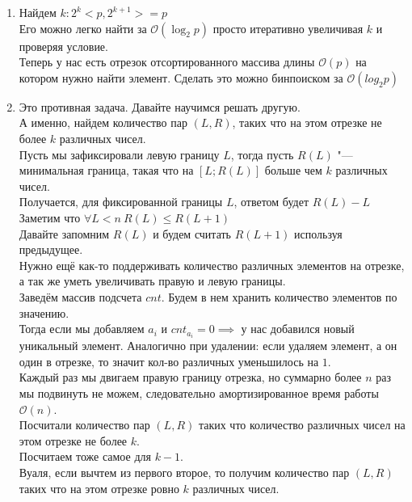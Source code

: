 \documentclass[a4paper, 10pt]{article}
\begin{document}
\begin{enumerate}

    \item{
        Найдем $k: 2^k < p, 2^{k + 1} >= p$\\
        Его можно легко найти за $\mathcal{O}(\log_2{p})$ просто итеративно увеличивая $k$ и проверяя условие.\\ 
        Теперь у нас есть отрезок отсортированного массива длины $\mathcal{O}(p)$ на котором нужно найти элемент. Сделать это можно бинпоиском за $\mathcal{O}(log_2{p})$\\
    }

    \item{
        Это противная задача. Давайте научимся решать другую.\\
        А именно, найдем количество пар $(L,R)$, таких что на этом отрезке не более $k$ различных чисел.\\
        Пусть мы зафиксировали левую границу $L$, тогда пусть $R(L)$ "--- минимальная граница, такая что на $[L; R(L)]$ больше чем $k$ различных чисел.\\
        Получается, для фиксированной границы $L$, ответом будет $R(L) - L$\\
        Заметим что $\forall L < n \medspace R(L) \leq R(L + 1)$\\
        Давайте запомним $R(L)$ и будем считать $R(L + 1)$ используя предыдущее.\\
        Нужно ещё как-то поддерживать количество различных элементов на отрезке, а так же уметь увеличивать правую и левую границы.\\
        Заведём массив подсчета $cnt$. Будем в нем хранить количество элементов по значению.\\
        Тогда если мы добавляем $a_i$ и $cnt_{a_i} = 0 \implies $ у нас добавился новый уникальный элемент.
        Аналогично при удалении: если удаляем элемент, а он один в отрезке, то значит кол-во различных уменьшилось на $1$.\\
        Каждый раз мы двигаем правую границу отрезка, но суммарно более $n$ раз мы подвинуть не можем, следовательно амортизированное время работы $\mathcal{O}(n)$.\\
        Посчитали количество пар $(L, R)$ таких что количество различных чисел на этом отрезке не более $k$.\\
        Посчитаем тоже самое для $k - 1$.\\
        Вуаля, если вычтем из первого второе, то получим количество пар $(L, R)$ таких что на этом отрезке ровно $k$ различных чисел.\\
    }


\end{enumerate}
\end{document}

